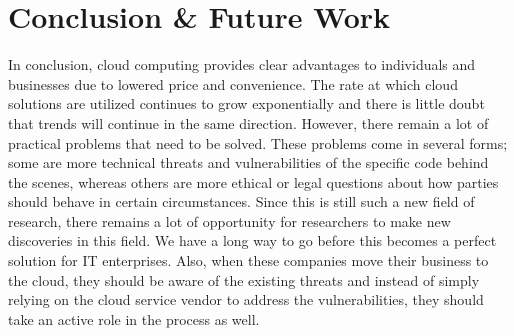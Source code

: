 \documentclass[a4paper, 8pt]{article} %
\begin{document}
\begin{doublespacing}
\begin{itemize}
\end{itemize}

\section*{Conclusion \& Future Work}

In conclusion, cloud computing provides clear advantages to individuals and businesses due to lowered price and convenience.  The rate at which cloud solutions are utilized continues to grow exponentially and there is little doubt that trends will continue in the same direction.  However, there remain a lot of practical problems that need to be solved.  These problems come in several forms; some are more technical threats and vulnerabilities of the specific code behind the scenes, whereas others are more ethical or legal questions about how parties should behave in certain circumstances.  Since this is still such a new field of research, there remains a lot of opportunity for researchers to make new discoveries in this field.  We have a long way to go before this becomes a perfect solution for IT enterprises.  Also, when these companies move their business to the cloud, they should be aware of the existing threats and instead of simply relying on the cloud service vendor to address the vulnerabilities, they should take an active role in the process as well.  

\end{doublespacing}

\newpage
\end{document}
